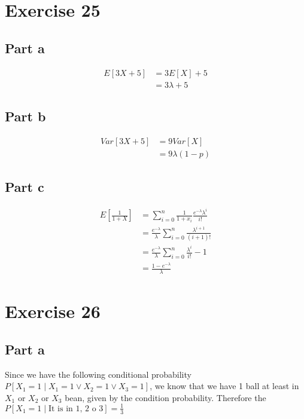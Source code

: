 \documentclass[12pt, a4paper]{article}
\begin{document}
\section{Exercise 25}
\subsection{Part a}

\begin{align*}
  E[3X + 5] &= 3E[X] + 5\\
            &= 3\lambda + 5
\end{align*}

\subsection{Part b}

\begin{align*}
  Var[3X + 5] &= 9 Var[X]\\
              &= 9 \lambda (1 - p)
\end{align*}

\subsection{Part c}

\begin{align*}
  E[\frac{1}{1+X}] &= \sum_{i=0}^{n} \frac{1}{1+x_i} \frac{e^{-\lambda} \lambda^i}{i!}\\
                   &= \frac{e^{-\lambda}}{\lambda} \sum_{i=0}^{n} \frac{\lambda^{i+1}}{(i+1)!}\\
                   &= \frac{e^{-\lambda}}{\lambda} \sum_{i=0}^{n} \frac{\lambda^i}{i!} - 1\\
                   &= \frac{1 - e^{-\lambda}}{\lambda}
\end{align*}

\section{Exercise 26}
\subsection{Part a}

Since we have the following conditional probability $P[X_1 = 1 \mid X_1 = 1 \lor
X_2 = 1 \lor X_3 = 1]$, we know that we have 1 ball at least in $X_1$ or $X_2$
or $X_3$ bean, given by the condition probability. Therefore the $P[X_1 = 1 \mid
\text{It is in 1, 2 o 3}] = \frac{1}{3}$ 
\end{document}
